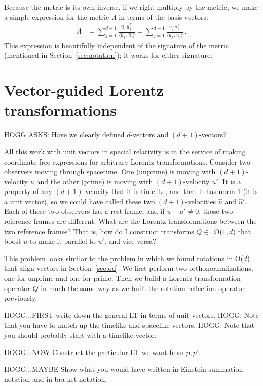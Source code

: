 \documentclass{article}
\newcommand{\inner}[2]{\langle{#1}\,,{#2}\rangle}
\newcommand{\plus}{\!+\!} %
\newcommand{\secref}[1]{Section~\ref{#1}}
\begin{document}
Because the metric is its own inverse, if we right-multiply by the metric, we make a simple expression for the metric $\Lambda$ in terms of the basis vectors:
\begin{align}
    \Lambda &= \sum_{j=1}^{d+1} \frac{\hat{u}_j\,\hat{u}_j^\top}{\inner{\hat{u}_j}{\hat{u}_j}} = \sum_{j=1}^{d+1} \frac{u_j\,u_j^\top}{\inner{u_j}{u_j}} ~.
\end{align}
This expression is beautifully independent of the signature of the metric (mentioned in \secref{sec:notation}); it works for either signature.

\section{Vector-guided Lorentz transformations}\label{sec:lt}

HOGG ASKS: Have we clearly defined $d$-vectors and $(d\plus1)$-vectors?

All this work with unit vectors in special relativity is in the service of making coordinate-free expressions for arbitrary Lorentz transformations.
Consider two observers moving through spacetime.
One (unprime) is moving with $(d\plus1)$-velocity $u$ and the other (prime) is moving with $(d\plus1)$-velocity $u'$.
It is a property of any $(d\plus1)$-velocity that it is timelike, and that it has norm 1 (it is a unit vector), so we could have called these two $(d\plus1)$-velocities $\hat{u}$ and $\hat{u}'$.
Each of these two observers has a rest frame, and if $u-u'\neq 0$, those two reference frames are different.
What are the Lorentz transformations between the two reference frames?
That is, how do I construct transforms $Q\in$~O($1,d$) that boost $u$ to make it parallel to $u'$, and vice versa?

This problem looks similar to the problem in which we found rotations in O($d$) that align vectors in \secref{sec:od}.
We first perform two orthonormalizations, one for unprime and one for prime.
Then we build a Lorentz transformation operator $Q$ in much the same way as we built the rotation-reflection operator previously.

HOGG...FIRST write down the general LT in terms of unit vectors.
HOGG: Note that you have to match up the timelike and spacelike vectors.
HOGG: Note that you should probably start with a timelike vector.

HOGG...NOW Construct the particular LT we want from $p, p'$.

HOGG...MAYBE Show what you would have written in Einstein summation notation and in bra-ket notation.
\end{document}
